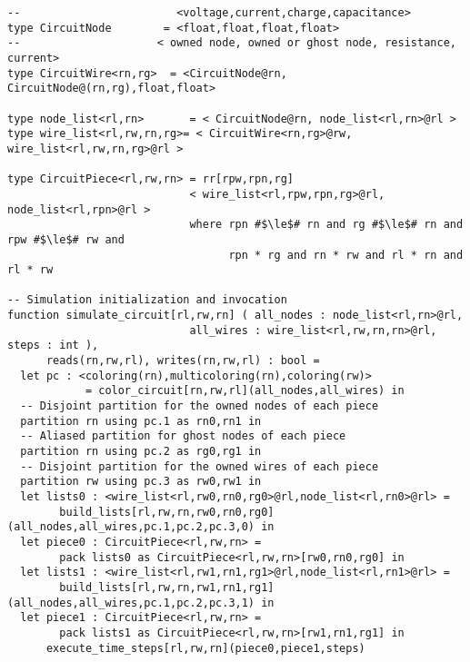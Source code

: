 \begin{lstlisting}[float={t},label={lst:circuit_ex},caption={Circuilt Simulation}]
--                        <voltage,current,charge,capacitance>
type CircuitNode        = <float,float,float,float>
--                     < owned node, owned or ghost node, resistance, current>
type CircuitWire<rn,rg>  = <CircuitNode@rn, CircuitNode@(rn,rg),float,float>

type node_list<rl,rn>       = < CircuitNode@rn, node_list<rl,rn>@rl >
type wire_list<rl,rw,rn,rg>= < CircuitWire<rn,rg>@rw, wire_list<rl,rw,rn,rg>@rl >

type CircuitPiece<rl,rw,rn> = rr[rpw,rpn,rg]
                            < wire_list<rl,rpw,rpn,rg>@rl, node_list<rl,rpn>@rl >         
                            where rpn #$\le$# rn and rg #$\le$# rn and rpw #$\le$# rw and
                                  rpn * rg and rn * rw and rl * rn and rl * rw

-- Simulation initialization and invocation
function simulate_circuit[rl,rw,rn] ( all_nodes : node_list<rl,rn>@rl, 
                            all_wires : wire_list<rl,rw,rn,rn>@rl, steps : int ), 
      reads(rn,rw,rl), writes(rn,rw,rl) : bool = 
  let pc : <coloring(rn),multicoloring(rn),coloring(rw)> 
            = color_circuit[rn,rw,rl](all_nodes,all_wires) in
  -- Disjoint partition for the owned nodes of each piece
  partition rn using pc.1 as rn0,rn1 in
  -- Aliased partition for ghost nodes of each piece
  partition rn using pc.2 as rg0,rg1 in
  -- Disjoint partition for the owned wires of each piece
  partition rw using pc.3 as rw0,rw1 in
  let lists0 : <wire_list<rl,rw0,rn0,rg0>@rl,node_list<rl,rn0>@rl> = 
        build_lists[rl,rw,rn,rw0,rn0,rg0](all_nodes,all_wires,pc.1,pc.2,pc.3,0) in
  let piece0 : CircuitPiece<rl,rw,rn> = 
        pack lists0 as CircuitPiece<rl,rw,rn>[rw0,rn0,rg0] in
  let lists1 : <wire_list<rl,rw1,rn1,rg1>@rl,node_list<rl,rn1>@rl> =
        build_lists[rl,rw,rn,rw1,rn1,rg1](all_nodes,all_wires,pc.1,pc.2,pc.3,1) in
  let piece1 : CircuitPiece<rl,rw,rn> = 
        pack lists1 as CircuitPiece<rl,rw,rn>[rw1,rn1,rg1] in
      execute_time_steps[rl,rw,rn](piece0,piece1,steps)


\end{lstlisting}
